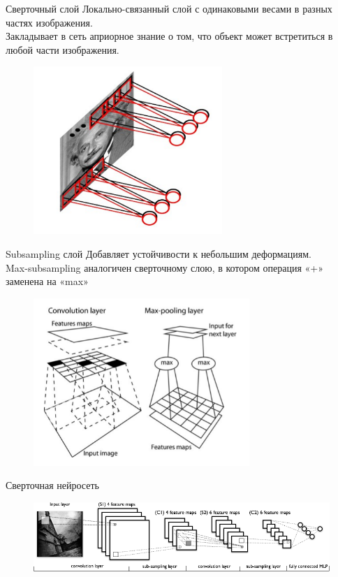\documentclass[10pt]{beamer}
\begin{document}
\begin{frame}{Сверточный слой}
  Локально-связанный слой с одинаковыми весами в разных частях изображения.\\
  Закладывает в сеть априорное знание о том, что объект может встретиться в любой части изображения.
	\begin{figure}[htbp]
	  \includegraphics[height=180pt, keepaspectratio = true]{images/conv_layer}   
	\end{figure}
\end{frame}

\begin{frame}{Subsampling слой}
	Добавляет устойчивости к небольшим деформациям.\\
	Max-subsampling аналогичен сверточному слою, в котором операция «+» заменена на «max»
	\begin{figure}[htbp]
	  \includegraphics[height=180pt, keepaspectratio = true]{images/subsampling}   
	\end{figure}
\end{frame}

\begin{frame}{Сверточная нейросеть}
	\begin{figure}[htbp]
	  \includegraphics[height=75pt, keepaspectratio = true]{images/convnet}   
	\end{figure}
\end{frame}
\end{document}
